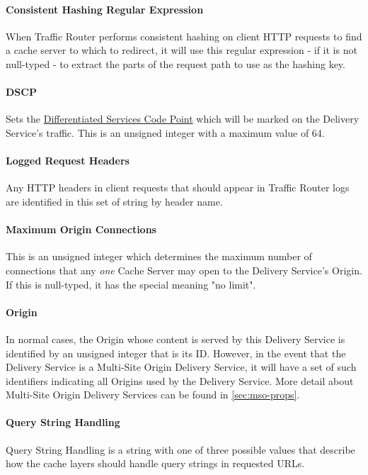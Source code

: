 \paragraph{Consistent Hashing Regular Expression}
When Traffic Router performs consistent hashing on client HTTP requests to find
a cache server to which to redirect, it will use this regular expression - if it
is not null-typed - to extract the parts of the request path to use as the
hashing key.

\paragraph{DSCP}
Sets the
\href{https://tools.ietf.org/html/rfc2474}{Differentiated Services Code Point}
which will be marked on the Delivery Service's traffic. This is an unsigned
integer with a maximum value of 64.

\paragraph{Logged Request Headers}
Any HTTP headers in client requests that should appear in Traffic Router logs
are identified in this set of string by header name.

\paragraph{Maximum Origin Connections}
This is an unsigned integer which determines the maximum number of connections
that any \emph{one} Cache Server may open to the Delivery Service's Origin.\\
If this is null-typed, it has the special meaning "no limit".

\paragraph{Origin}
In normal cases, the Origin whose content is served by this Delivery Service is
identified by an unsigned integer that is its ID. However, in the event that
the Delivery Service is a Multi-Site Origin Delivery Service, it will have a
set of such identifiers indicating all Origins used by the Delivery Service.
More detail about Multi-Site Origin Delivery Services can be found in
\ref{sec:mso-props}.

\paragraph{Query String Handling}
Query String Handling is a string with one of three possible values that
describe how the cache layers should handle query strings in requested URLs.

